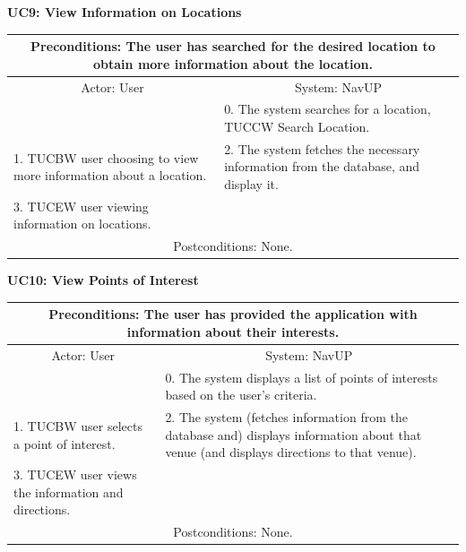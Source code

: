 \documentclass{article}
\begin{document}
				\vspace{5mm}
                \begin{flushleft}
                \textbf{UC9: View Information on Locations}\\
                \end{flushleft}
        		\centering	
       		 \small
       		 \begin{tabular}{|p{6cm}|p{6cm}|}
       		 \hline
       		 \multicolumn{2}{c}{\parbox{12cm}{\vspace{2mm}Preconditions: The user has searched for the desired location to obtain more information about the location.\vspace{2mm}}} \\
       		 \hline
       		 \multicolumn{1}{c}{Actor: User} & \multicolumn{1}{c}{ System: NavUP} \\
        		\hline
       		& 0.	The system searches for a location, TUCCW Search Location.\\
       		 \hline
       		 1.	TUCBW user choosing to view more information about a location.  & 2.	The system fetches the necessary information from the database, and display it.\\
        		\hline
       		 3.	TUCEW user viewing information on locations. &\\
       		 \hline
        		\multicolumn{2}{c}{Postconditions: None.} \\
        		\hline
        \end{tabular} 
      \newpage
				\vspace{5mm}
                \begin{flushleft}
                \textbf{UC10: View Points of Interest}\\
                \end{flushleft}
        		\centering			
       		 \small
       		 \begin{tabular}{|p{6cm}|p{6cm}|}
       		 \hline
       		\multicolumn{2}{c}{ Preconditions: The user has provided the application with information about their interests.} \\
       		 \hline
       		\multicolumn{1}{c}{Actor: User} & \multicolumn{1}{c}{ System: NavUP} \\
        		\hline
       		 & 0.	The system displays a list of points of interests based on the user's criteria.\\
       		 \hline
       		 1.	TUCBW user selects a point of interest. & 2.	The system (fetches information from the database and) displays information about that venue (and displays directions to that venue).\\
        		\hline
       		 3.	TUCEW user views the information and directions. &\\
       		 \hline
        		\multicolumn{2}{c}{Postconditions: None.} \\
        		\hline
        \end{tabular} 
      
\end{document}
